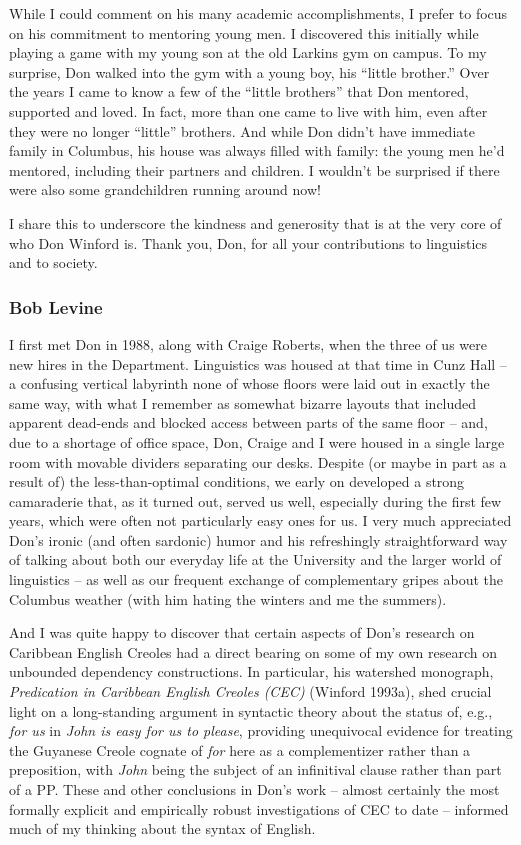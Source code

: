 \documentclass[output=paper, colorlinks,citecolor=brown]{langscibook}
\begin{document}
While I could comment on his many academic accomplishments, I prefer to focus on his commitment to mentoring young men. I discovered this initially while playing a game with my young son at the old Larkins gym on campus. To my surprise, Don walked into the gym with a young boy, his “little brother.” Over the years I came to know a few of the “little brothers” that Don mentored, supported and loved. In fact, more than one came to live with him, even after they were no longer “little” brothers. And while Don didn’t have immediate family in Columbus, his house was always filled with family: the young men he’d mentored, including their partners and children. I wouldn’t be surprised if there were also some grandchildren running around now!

I share this to underscore the kindness and generosity that is at the very core of who Don Winford is. Thank you, Don, for all your contributions to linguistics and to society. 

\subsubsection{Bob Levine}
I first met Don in 1988, along with Craige Roberts, when the three of us were new hires in the Department. Linguistics was housed at that time in Cunz Hall -- a confusing vertical labyrinth none of whose floors were laid out in exactly the same way, with what I remember as somewhat bizarre layouts that included apparent dead-ends and blocked access between parts of the same floor -- and, due to a shortage of office space, Don, Craige and I were housed in a single large room with movable dividers separating our desks. Despite (or maybe in part as a result of) the less-than-optimal conditions, we early on developed a strong camaraderie that, as it turned out, served us well, especially during the first few years, which were often not particularly easy ones for us. I very much appreciated Don’s ironic (and often sardonic) humor and his refreshingly straightforward way of talking about both our everyday life at the University and the larger world of linguistics -- as well as our frequent exchange of complementary gripes about the Columbus weather (with him hating the winters and me the summers). 
 
And I was quite happy to discover that certain aspects of Don’s research on Caribbean English Creoles had a direct bearing on some of my own research on unbounded dependency constructions. In particular, his watershed monograph, \textit{Predication in Caribbean English Creoles (CEC)} (Winford 1993a), shed crucial light on a long-standing argument in syntactic theory about the status of, e.g., \textit{for us} in \textit{John is easy for us to please}, providing unequivocal evidence for treating the Guyanese Creole cognate of \textit{for} here as a complementizer rather than a preposition, with \textit{John} being the subject of an infinitival clause rather than part of a PP. These and other conclusions in Don’s work -- almost certainly the most formally explicit and empirically robust investigations of CEC to date -- informed much of my thinking about the syntax of English. 
 
\end{document}
